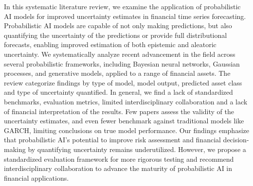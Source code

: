 \label{sec:abstract}




\normalsize In this systematic literature review, we examine the application of probabilistic AI models for improved uncertainty estimates in financial time series forecasting. Probabilistic AI models are capable of not only making predictions, but also quantifying the uncertainty of the predictions or provide full distributional forecasts, enabling improved estimation of both epistemic and aleatoric uncertainty. We systematically analyze recent advancement in the field across several probabilistic frameworks, including Bayesian neural networks, Gaussian processes, and generative models, applied to a range of financial assets. The review categorize findings by type of model, model output, predicted asset class and type of uncertainty quantified. In general, we find a lack of standardized benchmarks, evaluation metrics, limited interdisciplinary collaboration and a lack of financial interpretation of the results. Few papers assess the validity of the uncertainty estimates, and even fewer benchmark against traditional models like GARCH, limiting conclusions on true model performance. Our findings emphasize that probabilistic AI's potential to improve risk assessment and financial decision-making by quantifying uncertainty remains underutilized. However, we propose a standardized evaluation framework for more rigorous testing and recommend interdisciplinary collaboration to advance the maturity of probabilistic AI in financial applications.